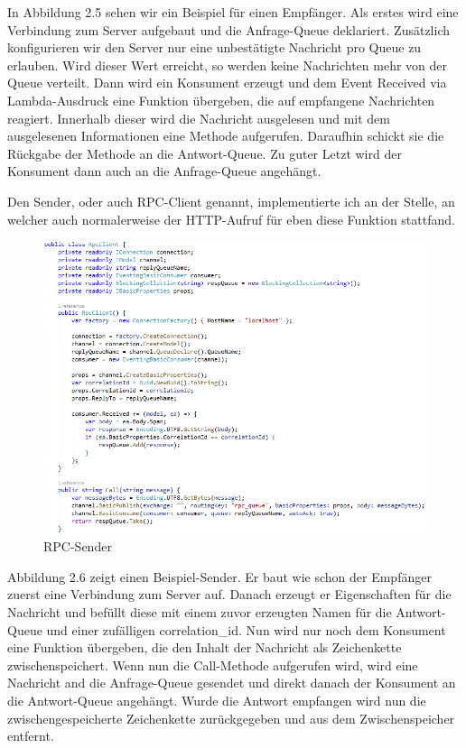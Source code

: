\documentclass[12pt,a4paper]{scrartcl}
\begin{document}
In Abbildung 2.5 sehen wir ein Beispiel für einen Empfänger. Als erstes wird eine Verbindung zum Server aufgebaut und die Anfrage-Queue deklariert. Zusätzlich konfigurieren wir den Server nur eine unbestätigte Nachricht pro Queue zu erlauben. Wird dieser Wert erreicht, so werden keine Nachrichten mehr von der Queue verteilt. Dann wird ein Konsument erzeugt und dem Event Received via Lambda-Ausdruck eine Funktion übergeben, die auf empfangene Nachrichten reagiert. Innerhalb dieser wird die Nachricht ausgelesen und mit dem ausgelesenen Informationen eine Methode aufgerufen. Daraufhin schickt sie die Rückgabe der Methode an die Antwort-Queue. Zu guter Letzt wird der Konsument dann auch an die Anfrage-Queue angehängt.

Den Sender, oder auch RPC-Client genannt, implementierte ich an der Stelle, an welcher auch normalerweise der HTTP-Aufruf für eben diese Funktion stattfand.

\begin{figure}[h!]
	\centering
	\includegraphics[scale=0.7]{RPCKlientWhite.png}
	\caption[Screenshot]{RPC-Sender}
\end{figure}

Abbildung 2.6 zeigt einen Beispiel-Sender. Er baut wie schon der Empfänger zuerst eine Verbindung zum Server auf. Danach erzeugt er Eigenschaften für die Nachricht und befüllt diese mit einem zuvor erzeugten Namen für die Antwort-Queue und einer zufälligen correlation\_id. Nun wird nur noch dem Konsument eine Funktion übergeben, die den Inhalt der Nachricht als Zeichenkette zwischenspeichert. Wenn nun die Call-Methode aufgerufen wird, wird eine Nachricht and die Anfrage-Queue gesendet und direkt danach der Konsument an die Antwort-Queue angehängt. Wurde die Antwort empfangen wird nun die zwischengespeicherte Zeichenkette zurückgegeben und aus dem Zwischenspeicher entfernt.
\end{document}
